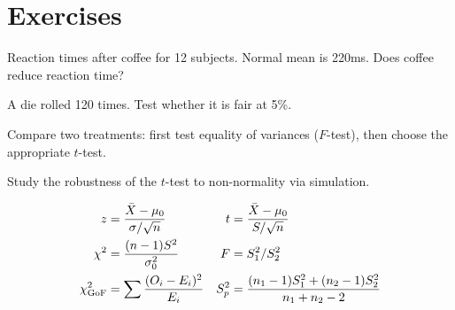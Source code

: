 \section{Exercises}

\begin{exercise}[$\star$]
Reaction times after coffee for 12 subjects. Normal mean is 220ms. Does coffee reduce reaction time?
\end{exercise}

\begin{exercise}[$\star$]
A die rolled 120 times. Test whether it is fair at 5\%.
\end{exercise}

\begin{exercise}[$\star\star$]
Compare two treatments: first test equality of variances ($F$-test), then choose the appropriate $t$-test.
\end{exercise}

\begin{exercise}
Study the robustness of the $t$-test to non-normality via simulation.
\end{exercise}

\begin{keyformulas}
\begin{align*}
z &= \frac{\bar{X}-\mu_0}{\sigma/\sqrt{n}} & t &= \frac{\bar{X}-\mu_0}{S/\sqrt{n}} \\
\chi^2 &= \frac{(n-1)S^2}{\sigma_0^2} & F &= S_1^2/S_2^2 \\
\chi^2_{\text{GoF}} &= \sum\frac{(O_i-E_i)^2}{E_i} & S_p^2 &= \frac{(n_1-1)S_1^2+(n_2-1)S_2^2}{n_1+n_2-2}
\end{align*}
\end{keyformulas}
